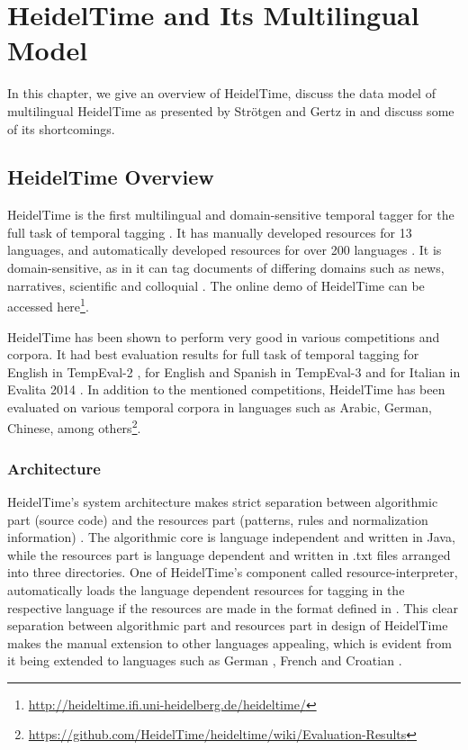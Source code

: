\chapter{HeidelTime and Its Multilingual Model} \label{the-chapter-3}
In this chapter, we give an overview of HeidelTime, discuss the data model of multilingual HeidelTime as presented by Str\"{o}tgen and Gertz in \cite{DBLP:conf/emnlp/StrotgenG15} and	 discuss some of its shortcomings.

\section{HeidelTime Overview}
HeidelTime is the first multilingual and domain-sensitive temporal tagger for the full task of temporal tagging \cite{DBLP:series/synthesis/2016Strotgen}. It has manually developed resources for 13 languages, and automatically developed resources for over 200 languages \cite{DBLP:conf/emnlp/StrotgenG15}. It is domain-sensitive, as in it can tag documents of differing domains such as news, narratives, scientific and colloquial \cite{DBLP:series/synthesis/2016Strotgen}. The online demo of HeidelTime can be accessed here\footnote{\url{http://heideltime.ifi.uni-heidelberg.de/heideltime/}}.

HeidelTime has been shown to perform very good in various competitions and corpora. It had best evaluation results for full task of temporal tagging for English in TempEval-2 \cite{DBLP:conf/semeval/VerhagenSCP10}, for English and Spanish in TempEval-3 \cite{DBLP:conf/semeval/UzZamanLDAVP13} and for Italian in Evalita 2014 \cite{caselli2014eventi}. In addition to the mentioned competitions, HeidelTime has been evaluated on various temporal corpora in languages such as Arabic, German, Chinese, among others\footnote{\url{https://github.com/HeidelTime/heideltime/wiki/Evaluation-Results}}. 

\subsection{Architecture}
HeidelTime's system architecture makes strict separation between algorithmic part (source code) and the resources part (patterns, rules and normalization information) \cite{DBLP:phd/de/Strotgen15}. The algorithmic core is language independent and written in Java, while the resources part is language dependent and written in .txt files arranged into three directories. One of HeidelTime's component called resource-interpreter, automatically loads the language dependent resources for tagging in the respective language if the resources are made in the format defined in \cite{DBLP:phd/de/Strotgen15}. This clear separation between algorithmic part and resources part in design of HeidelTime makes the manual extension to other languages appealing, which is evident from it being extended to languages such as German \cite{DBLP:phd/de/Strotgen15}, French \cite{moriceau2013french} and Croatian \cite{skukan2014heideltime}. 


